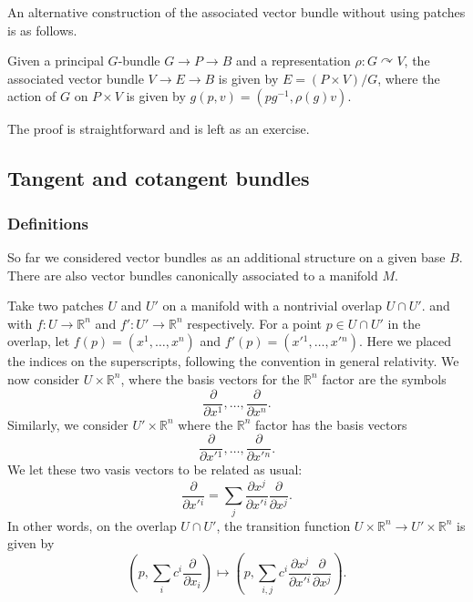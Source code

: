 \documentclass[12pt]{article}
\numberwithin{equation}{section}
\def\bR{\mathbb{R}}
\begin{document}
An alternative construction of the associated vector bundle 
without using patches is as follows. 
\begin{proposition}
  Given a principal $G$-bundle $G\to P\to B$ and a representation $\rho: G\curvearrowright V$,
  the associated vector bundle $V\to E\to B$ is given by
  $E= (P \times V)/G$,
  where the action of $G$ on $P\times V$ is given by $g(p,v)=(pg^{-1},\rho(g)v)$.
\end{proposition}
The proof is straightforward and is left as an exercise.

\subsection{Tangent and cotangent bundles}

\subsubsection{Definitions}
So far we considered vector bundles as an additional structure on a given base $B$.
There are also vector bundles canonically associated to a manifold $M$.

Take two patches $U$ and $U'$ on a manifold
with a nontrivial overlap $U\cap U'$.
and with $f:U\to \bR^n$ and $f':U'\to \bR^n$ respectively.
For a point $p\in U\cap U'$ in the overlap,
let $f(p)=(x^1,\ldots,x^n)$ and $f'(p)=(x'{}^1,\ldots,x'{}^n)$.
Here we placed the indices on the superscripts, following the convention in general relativity.
We now consider $U\times \bR^n$,
where the basis vectors for the $\bR^n$ factor
are the symbols
\begin{equation}
\frac{\partial}{\partial x^1},\ldots,\frac{\partial}{\partial x^n}.
\end{equation}
Similarly, we consider $U'\times \bR^n$
where the $\bR^n$ factor has the basis vectors
\begin{equation}
\frac{\partial}{\partial x'{}^1},\ldots,\frac{\partial}{\partial x'{}^n}.
\end{equation}
We let these two vasis vectors to be related as usual:
\begin{equation}
\frac{\partial}{\partial x'{}^i} = \sum_{j}\frac{\partial x^j}{\partial x'{}^i} \frac{\partial}{\partial x^j}.
\label{eq:contravariant}
\end{equation}
In other words, on the overlap $U\cap U'$,
the transition function $U\times \bR^n \to U'\times \bR^n$ is given by 
\begin{equation}
  (p,\sum_i c^i\frac{\partial}{\partial x_i} )
  \mapsto 
  (p, \sum_{i,j} c^i \frac{\partial x^j}{\partial x'{}^i} \frac{\partial}{\partial x^j}).
\end{equation}
\end{document}
